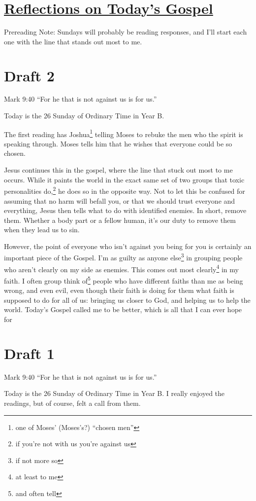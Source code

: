 \documentclass[12pt]{article}[titlepage]
\newcommand{\say}[1]{``#1''}
\newcommand{\1}{\={a}}
\newcommand{\2}{\={e}}
\newcommand{\3}{\={\i}}
\newcommand{\4}{\=o}
\newcommand{\5}{\=u}
\newcommand{\6}{\={A}}
\renewcommand{\,}{\textsuperscript{,}}
\begin{document}
\doublespacing
\section{\href{reflections-on-readings-26-ordinary-b.html}{Reflections on Today's Gospel}}
Prereading Note: Sundays will probably be reading responses, and I'll start each one with the line that stands out most to me.
\section{Draft 2}
Mark 9:40 \say{For he that is not against us is for us.}

Today is the 26 Sunday of Ordinary Time in Year B.

The first reading has Joshua\footnote{one of Moses' (Moses's?) \say{chosen men}} telling Moses to rebuke the men who the spirit is speaking through.
Moses tells him that he wishes that everyone could be so chosen.

Jesus continues this in the gospel, where the line that stuck out most to me occurs.
While it paints the world in the exact same set of two groups that toxic personalities do,\footnote{if you're not with us you're against us} he does so in the opposite way.
Not to let this be confused for assuming that no harm will befall you, or that we should trust everyone and everything, Jesus then tells what to do with identified enemies.
In short, remove them.
Whether a body part or a fellow human, it's our duty to remove them when they lead us to sin.

However, the point of everyone who isn't against you being for you is certainly an important piece of the Gospel.
I'm as guilty as anyone else\footnote{if not more so} in grouping people who aren't clearly on my side as enemies.
This comes out most clearly\footnote{at least to me} in my faith.
I often group think of\footnote{and often tell} people who have different faiths than me as being wrong, and even evil, even though their faith is doing for them what faith is supposed to do for all of us: bringing us closer to God, and helping us to help the world.
Today's Gospel called me to be better, which is all that I can ever hope for

\section{Draft 1}
Mark 9:40 \say{For he that is not against us is for us.}

Today is the 26 Sunday of Ordinary Time in Year B.
I really enjoyed the readings, but of course, felt a call from them.
\end{document}

